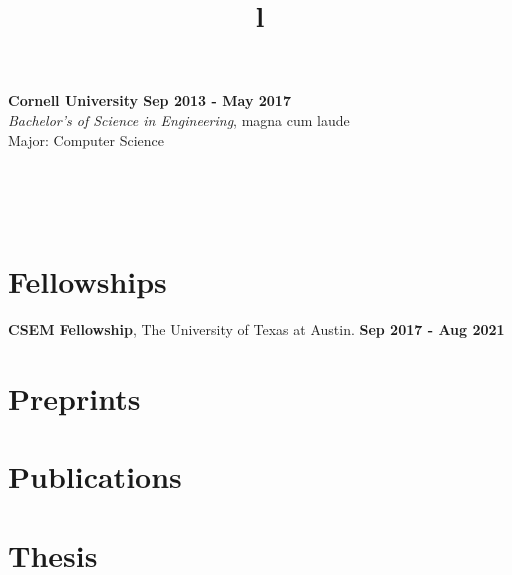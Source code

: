 \documentclass[10pt,margin]{res}
\begin{document}
\begin{resume}
\textbf{Cornell University \hfill{Sep 2013 - May 2017}} \\
{\sl Bachelor's of Science in Engineering}, magna cum laude\\
Major: Computer Science

\begin{format}
\title{l}\\
\\
\body\\
\end{format}

\section{Fellowships}
\textbf{CSEM Fellowship}, The University of Texas at Austin. \hfill{\textbf{Sep 2017 - Aug 2021}}

\vspace{-1em}

\section{Preprints}
\printbibliography[category=preprint, title={}, heading=none]

\section{Publications}
\printbibliography[category=published, title={}, heading=none]

\vspace{-1em}

\section{Thesis}

\printbibliography[category=thesis,title={},heading=none]

\newpage


\end{resume}
\end{document}
